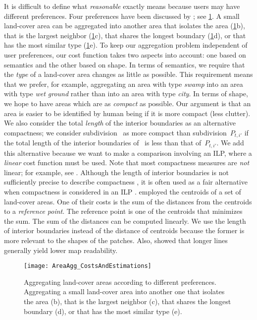 It is difficult to define what \emph{reasonable} exactly means 
because users may have different preferences.
Four preferences have been discussed by
\textcite{Cheng2006}; see \fig\ref{fig:AreaAgg_Preferences}.
A small land-cover area can be aggregated into another area 
that isolates the area 
(\fig\ref{fig:AreaAgg_Preferences}b), 
that is the largest neighbor 
(\fig\ref{fig:AreaAgg_Preferences}c), 
that shares the longest boundary 
(\fig\ref{fig:AreaAgg_Preferences}d), or 
that has the most similar type
(\fig\ref{fig:AreaAgg_Preferences}e).
To keep our aggregation problem independent of user preferences,
our cost function takes two aspects into account: 
one based on semantics and 
the other based on shape.
%
In terms of semantics, we require that 
the \emph{type} of a land-cover area changes 
as little as possible.
This requirement means that we prefer, for example, 
aggregating an area with type \emph{swamp} 
into an area with type \emph{wet ground} 
rather than into an area with type \emph{city}.
%
In terms of shape, we hope to have areas 
which are as \emph{compact} as possible.
Our argument is that an area is easier 
to be identified by human being 
if it is more compact (less clutter).
%
We also consider the total \emph{length} 
of the interior boundaries as an alternative compactness;
we consider subdivision~\Pnode 
as more compact than subdivision~$P_{t,i'}$ 
if the total length of the interior boundaries of~\Pnode 
is less than that of~$P_{t,i'}$.
We add this alternative because we want to make a comparison 
involving an ILP, 
where a \emph{linear} cost function must be used.
Note that most compactness measures
are \emph{not} linear;
for example, see \textcite{Maceachren1985,Li2013Compactness}.
Although the length of interior boundaries 
is not sufficiently precise 
to describe compactness \parencite{Young1988},
it is often used as a fair alternative
when compactness is considered in an ILP
\parencite[e.g.,][]{Minas2016,Wright1983}.
\textcite{HaunertWolff2010AreaAgg} employed 
the centroids of a set of land-cover areas.
One of their costs is the sum of the distances 
from the centroids to a \emph{reference point}.
The reference point is one of the centroids
that minimizes the sum.
The sum of the distances can be computed linearly.
We use the length of interior boundaries 
instead of the distance of centroids because the former 
is more relevant to the shapes of the patches.
Also, \textcite{Harrie2015Readability} showed that
longer lines generally yield lower map readability.

\begin{figure}[tb]
\centering
\texttt{[image: AreaAgg\_CostsAndEstimations]}
\caption{Aggregating land-cover areas 
	according to different preferences.
	Aggregating a small land-cover area into another one 
	that isolates the area (b), 
	that is the largest neighbor (c), 
	that shares the longest boundary (d), or 
	that has the most similar type (e).}
\label{fig:AreaAgg_Preferences}	
\end{figure}


